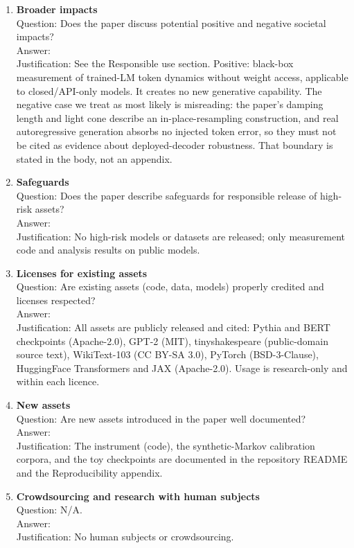 \begin{enumerate}
\item {\bf Broader impacts} \\
Question: Does the paper discuss potential positive and negative societal impacts? \\
Answer: \answerYes{} \\
Justification: See the Responsible use section. Positive: black-box measurement of trained-LM token dynamics without weight access, applicable to closed/API-only models. It creates no new generative capability. The negative case we treat as most likely is misreading: the paper's damping length and light cone describe an in-place-resampling construction, and real autoregressive generation absorbs no injected token error, so they must not be cited as evidence about deployed-decoder robustness. That boundary is stated in the body, not an appendix.

\item {\bf Safeguards} \\
Question: Does the paper describe safeguards for responsible release of high-risk assets? \\
Answer: \answerNA{} \\
Justification: No high-risk models or datasets are released; only measurement code and analysis results on public models.

\item {\bf Licenses for existing assets} \\
Question: Are existing assets (code, data, models) properly credited and licenses respected? \\
Answer: \answerYes{} \\
Justification: All assets are publicly released and cited: Pythia and BERT checkpoints (Apache-2.0), GPT-2 (MIT), tinyshakespeare (public-domain source text), WikiText-103 (CC BY-SA 3.0), PyTorch (BSD-3-Clause), HuggingFace Transformers and JAX (Apache-2.0). Usage is research-only and within each licence.

\item {\bf New assets} \\
Question: Are new assets introduced in the paper well documented? \\
Answer: \answerYes{} \\
Justification: The instrument (code), the synthetic-Markov calibration corpora, and the toy checkpoints are documented in the repository README and the Reproducibility appendix.

\item {\bf Crowdsourcing and research with human subjects} \\
Question: N/A. \\
Answer: \answerNA{} \\
Justification: No human subjects or crowdsourcing.


\end{enumerate}

